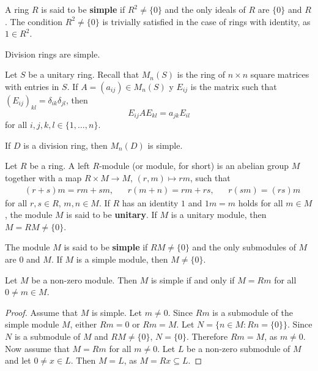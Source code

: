 A ring $R$ is said to be \textbf{simple} if $R^2\ne\{0\}$ and the only ideals of 
$R$ are $\{0\}$ and $R$. The condition $R^2\ne\{0\}$ is trivially satisfied in the case of rings
with identity, as $1\in R^2$. 

\begin{example}
	Division rings are simple.
\end{example}

Let $S$ be a unitary ring. Recall that $M_n(S)$ is the ring of $n\times n$ square matrices 
with entries in $S$.  If $A=(a_{ij})\in M_n(S)$ y $E_{ij}$ is the matrix
such that $(E_{ij})_{kl}=\delta_{ik}\delta_{jl}$, then
\begin{equation}
	\label{eq:trick}
E_{ij}AE_{kl}=a_{jk}E_{il}
\end{equation}
for all $i,j,k,l\in\{1,\dots,n\}$. 

\begin{exercise}
	If $D$ is a division ring, then $M_n(D)$ is simple. 
\end{exercise}

Let $R$ be a ring. A left $R$-module (or module, for short)  
is an abelian group $M$ together with a map $R\times M\to M$, $(r,m)\mapsto rm$, such that
\begin{align*}
	&(r+s)m=rm+sm, &&
	r(m+n)=rm+rs, && r(sm)=(rs)m    
\end{align*}
for all $r,s\in R$, $m,n\in M$.  If $R$ has an identity 
$1$ and $1m=m$ holds for all $m\in M$, the module $M$ is said to be 
\textbf{unitary}.  If $M$ is a unitary module, then $M=RM\ne\{0\}$.


The module $M$ is said to be 
\textbf{simple} if $RM\ne\{0\}$ and the only submodules of $M$ are $0$ and $M$.
If $M$ is a simple module, then $M\ne\{0\}$.


\begin{lemma}
	\label{lemma:simple}
	Let $M$ be a non-zero module. Then $M$ is simple if and only if $M=Rm$
	for all $0\ne m\in M$.
\end{lemma}

\begin{proof}
	Assume that $M$ is simple.  Let $m\ne 0$. Since $Rm$ is a submodule of the simple 
	module $M$, either $Rm=0$ or $Rm=M$.  Let $N=\{n\in M:Rn=\{0\}\}$. Since $N$ is a 
	submodule of $M$ and $RM\ne\{0\}$, $N=\{0\}$. Therefore $Rm=M$, as $m\ne0$.
	Now assume that $M=Rm$ for all $m\ne0$. Let $L$ be a non-zero submodule of 
	$M$ and let $0\ne x\in L$. Then $M=L$, as $M=Rx\subseteq L$. 
\end{proof} 

